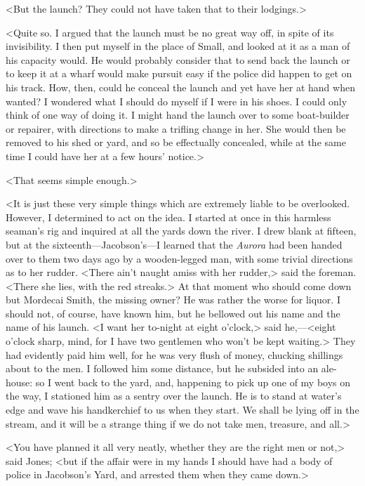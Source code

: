 <But the launch? They could not have taken that to their lodgings.>

<Quite so. I argued that the launch must be no great way off, in spite of its invisibility. I then put myself in the place of Small, and looked at it as a man of his capacity would. He would probably consider that to send back the launch or to keep it at a wharf would make pursuit easy if the police did happen to get on his track. How, then, could he conceal the launch and yet have her at hand when wanted? I wondered what I should do myself if I were in his shoes. I could only think of one way of doing it. I might hand the launch over to some boat-builder or repairer, with directions to make a trifling change in her. She would then be removed to his shed or yard, and so be effectually concealed, while at the same time I could have her at a few hours' notice.>

<That seems simple enough.>

<It is just these very simple things which are extremely liable to be overlooked. However, I determined to act on the idea. I started at once in this harmless seaman's rig and inquired at all the yards down the river. I drew blank at fifteen, but at the sixteenth—Jacobson's—I learned that the \textit{Aurora} had been handed over to them two days ago by a wooden-legged man, with some trivial directions as to her rudder. <There ain't naught amiss with her rudder,> said the foreman. <There she lies, with the red streaks.> At that moment who should come down but Mordecai Smith, the missing owner? He was rather the worse for liquor. I should not, of course, have known him, but he bellowed out his name and the name of his launch. <I want her to-night at eight o'clock,> said he,—<eight o'clock sharp, mind, for I have two gentlemen who won't be kept waiting.> They had evidently paid him well, for he was very flush of money, chucking shillings about to the men. I followed him some distance, but he subsided into an ale-house: so I went back to the yard, and, happening to pick up one of my boys on the way, I stationed him as a sentry over the launch. He is to stand at water's edge and wave his handkerchief to us when they start. We shall be lying off in the stream, and it will be a strange thing if we do not take men, treasure, and all.>

<You have planned it all very neatly, whether they are the right men or not,> said Jones; <but if the affair were in my hands I should have had a body of police in Jacobson's Yard, and arrested them when they came down.>

